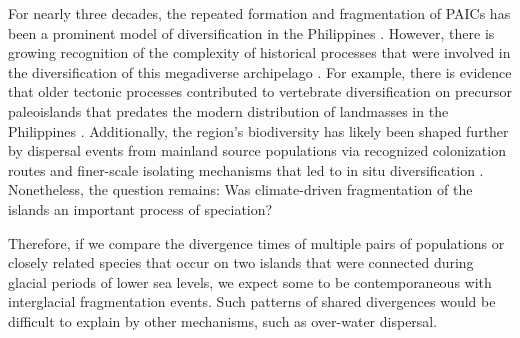 For nearly three decades, the repeated formation and fragmentation of PAICs has
been a prominent model of diversification in the Philippines
\citep{Inger1954,Heaney1985,RafeGuttman2002,Evans2003,Heaney2005,Roberts2006,Linkem2010,Siler2010,Siler2011,Siler2012,Rafe2013}.
However, there is growing recognition of the complexity of historical processes
that were involved in the diversification of this megadiverse archipelago
.
For example,
there is evidence that older tectonic processes contributed to vertebrate
diversification on precursor paleoislands that predates the modern distribution
of landmasses in the Philippines
\citep[$\sim$30--5 mya;][]{Jansa2006,Blackburn2010,Siler2012,Rafe2013}.
Additionally, the region's biodiversity has likely been shaped further by
dispersal events from mainland source populations via recognized colonization
routes
and finer-scale isolating
mechanisms that led to in situ diversification
.
Nonetheless, the question remains: Was climate-driven fragmentation of the
islands an important process of speciation? 

Therefore, if we compare the divergence times of multiple pairs of populations
or closely related species that occur on two islands that were connected during
glacial periods of lower sea levels, we expect some to be contemporaneous
with interglacial fragmentation events.
Such patterns of shared divergences would be difficult to explain by
other mechanisms, such as over-water dispersal.

